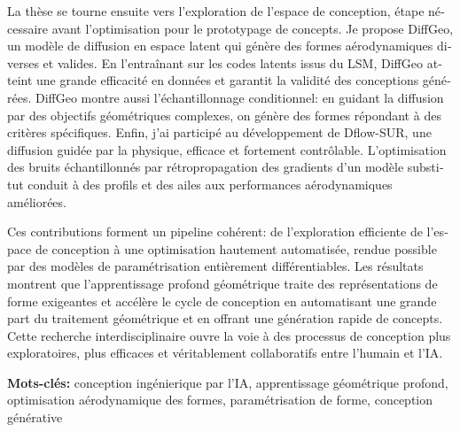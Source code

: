 \begin{otherlanguage}{french}
La thèse se tourne ensuite vers l’exploration de l’espace de conception, étape nécessaire avant l’optimisation pour le prototypage de concepts. Je propose DiffGeo, un modèle de diffusion en espace latent qui génère des formes aérodynamiques diverses et valides. En l’entraînant sur les codes latents issus du LSM, DiffGeo atteint une grande efficacité en données et garantit la validité des conceptions générées. DiffGeo montre aussi l’échantillonnage conditionnel: en guidant la diffusion par des objectifs géométriques complexes, on génère des formes répondant à des critères spécifiques. Enfin, j’ai participé au développement de Dflow-SUR, une diffusion guidée par la physique, efficace et fortement contrôlable. L’optimisation des bruits échantillonnés par rétropropagation des gradients d’un modèle substitut conduit à des profils et des ailes aux performances aérodynamiques améliorées.

Ces contributions forment un pipeline cohérent: de l’exploration efficiente de l’espace de conception à une optimisation hautement automatisée, rendue possible par des modèles de paramétrisation entièrement différentiables. Les résultats montrent que l’apprentissage profond géométrique traite des représentations de forme exigeantes et accélère le cycle de conception en automatisant une grande part du traitement géométrique et en offrant une génération rapide de concepts. Cette recherche interdisciplinaire ouvre la voie à des processus de conception plus exploratoires, plus efficaces et véritablement collaboratifs entre l’humain et l’IA.

\textbf{Mots-clés:} conception ingénierique par l’IA, apprentissage géométrique profond, optimisation aérodynamique des formes, paramétrisation de forme, conception générative

\end{otherlanguage}


